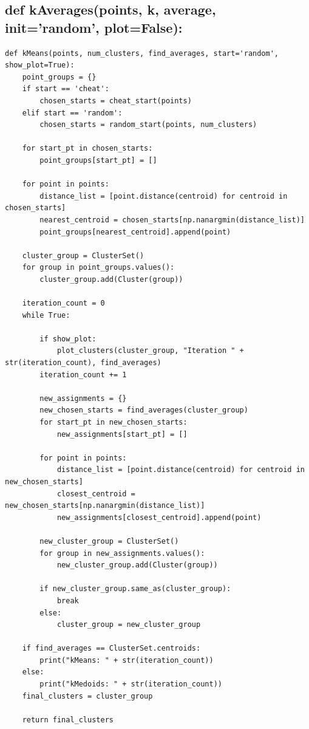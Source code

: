 \documentclass[10pt]{article}
\begin{document}
\subsection*{def kAverages(points, k, average, init='random', plot=False):}
\begin{verbatim}
def kMeans(points, num_clusters, find_averages, start='random', show_plot=True):
    point_groups = {}
    if start == 'cheat':
        chosen_starts = cheat_start(points)
    elif start == 'random':
        chosen_starts = random_start(points, num_clusters)

    for start_pt in chosen_starts:
        point_groups[start_pt] = []

    for point in points:
        distance_list = [point.distance(centroid) for centroid in chosen_starts]
        nearest_centroid = chosen_starts[np.nanargmin(distance_list)]
        point_groups[nearest_centroid].append(point)

    cluster_group = ClusterSet()
    for group in point_groups.values():
        cluster_group.add(Cluster(group))

    iteration_count = 0
    while True:

        if show_plot:
            plot_clusters(cluster_group, "Iteration " + str(iteration_count), find_averages)
        iteration_count += 1

        new_assignments = {}
        new_chosen_starts = find_averages(cluster_group)
        for start_pt in new_chosen_starts:
            new_assignments[start_pt] = []

        for point in points:
            distance_list = [point.distance(centroid) for centroid in new_chosen_starts]
            closest_centroid = new_chosen_starts[np.nanargmin(distance_list)]
            new_assignments[closest_centroid].append(point)

        new_cluster_group = ClusterSet()
        for group in new_assignments.values():
            new_cluster_group.add(Cluster(group))

        if new_cluster_group.same_as(cluster_group):
            break
        else:
            cluster_group = new_cluster_group

    if find_averages == ClusterSet.centroids:
        print("kMeans: " + str(iteration_count))
    else:
        print("kMedoids: " + str(iteration_count))
    final_clusters = cluster_group

    return final_clusters
\end{verbatim}
\end{document}

